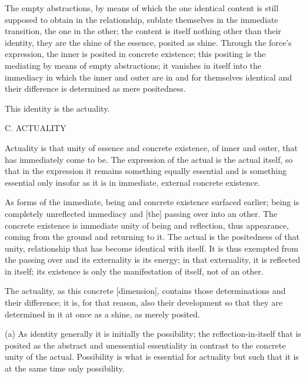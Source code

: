 The empty abstractions, by means of which
the one identical content is still supposed
to obtain in the relationship,
sublate themselves in the immediate transition,
the one in the other;
the content is itself nothing other than their identity,
they are the shine of the essence, posited as shine.
Through the force's expression, the inner is posited in concrete existence;
this positing is the mediating by means of empty abstractions;
it vanishes in itself into the immediacy in which
the inner and outer are in and for themselves identical and
their difference is determined as mere positedness.

This identity is the actuality.

C. ACTUALITY

Actuality is that unity of essence and concrete existence,
of inner and outer, that has immediately come to be.
The expression of the actual is the actual itself,
so that in the expression it remains something equally essential
and is something essential only insofar as it is
in immediate, external concrete existence.

As forms of the immediate,
being and concrete existence surfaced earlier;
being is completely unreflected immediacy and [the]
passing over into an other.
The concrete existence is immediate unity
of being and reflection, thus appearance,
coming from the ground and returning to it.
The actual is the positedness of that unity,
relationship that has become identical with itself.
It is thus exempted from the passing over and
its externality is its energy;
in that externality, it is reflected in itself;
its existence is only the manifestation of itself,
not of an other.

The actuality, as this concrete [dimension], contains
those determinations and their difference;
it is, for that reason, also their development
so that they are determined in it at once
as a shine, as merely posited.

(a) As identity generally it is initially the possibility;
the reflection-in-itself that is posited as the abstract and
unessential essentiality in contrast to the
concrete unity of the actual.
Possibility is what is essential for actuality but
such that it is at the same time only possibility.

